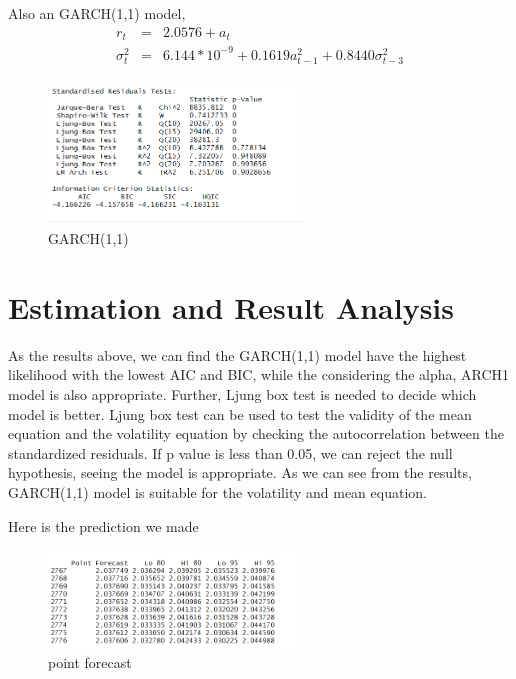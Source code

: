 \documentclass[12pt, a4paper, titlepage]{article}
\begin{document}
Also an GARCH(1,1) model,
\begin{eqnarray*}
r_t &=& 2.0576 + a_t\\
\sigma_t^2 &=& 6.144*10^{-9} + 0.1619 a_{t-1}^2 + 0.8440 \sigma_{t-3}^2
\end{eqnarray*}
\begin{figure}[h!]
\begin{center}
\caption{GARCH(1,1)}\label{GARCH(1,1)}
\includegraphics[width=0.6\textwidth]{garch11a.png} 
\end{center}
\end{figure}

\section{Estimation and Result Analysis}
As the results above, we can find the GARCH(1,1) model have the highest likelihood with the lowest AIC and BIC, while the considering the alpha, ARCH1 model is also appropriate. Further, Ljung box test is needed to decide which model is better. Ljung box test can be used to test the validity of the mean equation and the volatility equation by checking the autocorrelation between the standardized residuals. If p value is less than 0.05, we can reject the null hypothesis, seeing the model is appropriate. As we can see from the results, GARCH(1,1) model is suitable for the volatility and mean equation.

Here is the prediction we made
\begin{figure}[h!]
\begin{center}
\caption{point forecast}\label{pre}
\includegraphics[width=0.6\textwidth]{pre.png}
\end{center}
\end{figure}
\end{document}
